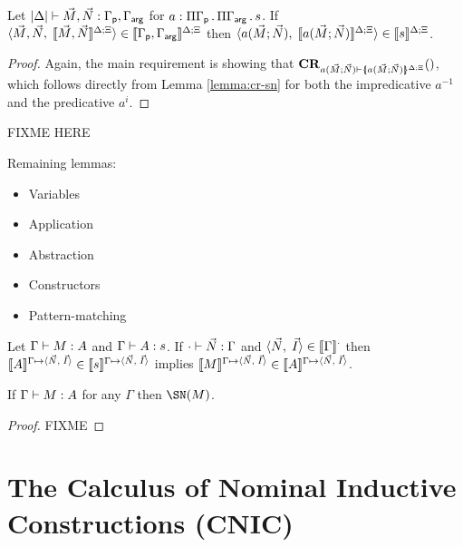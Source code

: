 \documentclass[conference]{IEEEtran}
\begin{document}
\begin{lemma}
  \label{lemma:ind-types}
  Let $\typejd{\vec{M},\vec{N}}{\Gammap,\Gammaarg}$ for
  $a:\pigamma{\Gammap}{\pigamma{\Gammaarg}{s}}$.  If
  $\pair{\vec{M},\vec{N}}{\interp{\vec{M},\vec{N}}}\in\interp{\Gammap,\Gammaarg}$
  then
  $\pair{\ctorapp{a}{\vec{M}}{\vec{N}}}{\interp{\ctorapp{a}{\vec{M}}{\vec{N}}}}\in
  \interp{s}$.
\end{lemma}

\begin{proof}
  Again, the main requirement is showing that
  $\CR{\ctorapp{a}{\vec{M}}{\vec{N}}}{\interpd{\ctorapp{a}{\vec{M}}{\vec{N}}}}$,
  which follows directly from Lemma \ref{lemma:cr-sn} for both the
  impredicative $a^{-1}$ and the predicative $a^i$.
\end{proof}


FIXME HERE

Remaining lemmas:
\begin{itemize}
\item Variables
\item Application
\item Abstraction
\item Constructors
\item Pattern-matching
\end{itemize}

\begin{theorem}[Reducibility]
  Let $\typej{M}{A}$ and $\typej{A}{s}$. If
  $\typej[\cdot]{\vec{N}}{\Gamma}$ and
  $\pair{\vec{N}}{\vec{I}}\in\interp[\cdot]{\Gamma}$ then
  $\interp[\Gamma\mapsto\pair{\vec{N}}{\vec{I}}]{A}\in\interp[\Gamma\mapsto\pair{\vec{N}}{\vec{I}}]{s}$ implies
  $\interp[\Gamma\mapsto\pair{\vec{N}}{\vec{I}}]{M}\in\interp[\Gamma\mapsto\pair{\vec{N}}{\vec{I}}]{A}$.
\end{theorem}

\begin{corollary}
If $\typej{M}{A}$ for any $\Gamma$ then $\SN(M)$.
\end{corollary}

\begin{proof}
FIXME
\end{proof}



\section{The Calculus of Nominal Inductive Constructions (CNIC)}
\label{sec:cnic}
\end{document}
